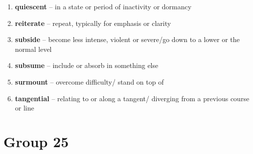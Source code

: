 \begin{enumerate}[wide,labelindent=0pt]
\item \textbf{quiescent} -- in a state or period of inactivity or dormancy
\item \textbf{reiterate} -- repeat, typically for emphasis or clarity
\item \textbf{subside} -- become less intense, violent or severe/go down to a lower or the normal level
\item \textbf{subsume} -- include or absorb in something else
\item \textbf{surmount} -- overcome difficulty/ stand on top of
\item \textbf{tangential} -- relating to or along a tangent/ diverging from a previous course or line
\end{enumerate}

\newpage
\section{Group 25}


